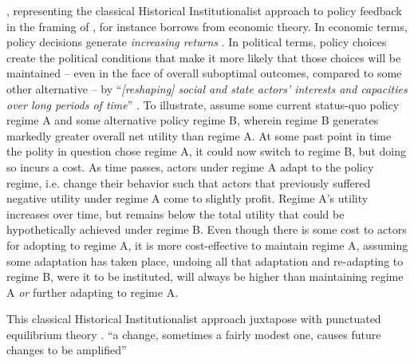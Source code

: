 \documentclass[11pt, xcolor=dvipsnames]{article}
\begin{document}
\textcite{Pierson2000}, representing the classical Historical Institutionalist approach to policy feedback in the framing of \textcite{Jacobs2014}, for instance borrows from economic theory. In economic terms, policy decisions generate \textit{increasing returns} \parencites[for economic discussion see][]{Arthur1994}[for application to instittional development see][]{Krasner1988}. In political terms, policy choices create the political conditions that make it more likely that those choices will be maintained -- even in the face of overall suboptimal outcomes, compared to some other alternative -- by \enquote{\textit{[reshaping] social and state actors' interests and capacities over long periods of time}} \parencite[][p. 443, original emphasis]{Jacobs2014}. To illustrate, assume some current status-quo policy regime A and some alternative policy regime B, wherein regime B generates markedly greater overall net utility than regime A. At some past point in time the polity in question chose regime A, it could now switch to regime B, but doing so incurs a cost. As time passes, actors under regime A adapt to the policy regime, i.e. change their behavior such that actors that previously suffered negative utility under regime A come to slightly profit. Regime A's utility increases over time, but remains below the total utility that could be hypothetically achieved under regime B. Even though there is some cost to actors for adopting to regime A, it is more cost-effective to maintain regime A, assuming some adaptation has taken place, undoing all that adaptation and re-adapting to regime B, were it to be instituted, will always be higher than maintaining regime A \textit{or} further adapting to regime A. 

This classical Historical Institutionalist approach \textcite{Jacobs2014} juxtapose with punctuated equilibrium theory \parencites{Baumgartner2009}{Baumgartner2002}. \enquote{a change, sometimes a fairly modest one, causes future changes to be amplified} \parencite[p. 61]{Baumgartner}
\end{document}
